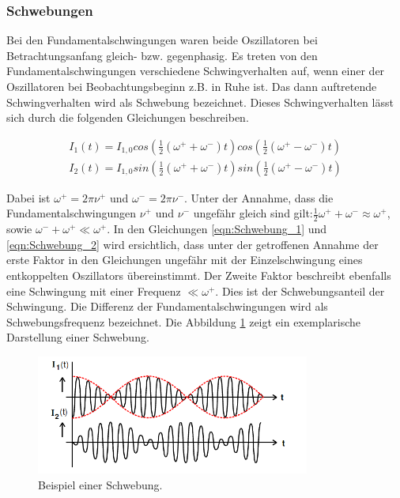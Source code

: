 \subsubsection{Schwebungen}

Bei den Fundamentalschwingungen waren beide Oszillatoren bei Betrachtungsanfang
gleich- bzw. gegenphasig. Es treten von den Fundamentalschwingungen
verschiedene Schwingverhalten auf, wenn einer der Oszillatoren bei
Beobachtungsbeginn z.B. in Ruhe ist.
Das dann auftretende Schwingverhalten wird als Schwebung bezeichnet.
Dieses Schwingverhalten lässt sich durch die folgenden Gleichungen beschreiben.

\begin{align}
  \label{eqn:Schwebung_1}
  I_1(t) = I_{1,0}cos\left(\frac{1}{2}\left(\omega^+ + \omega^-\right)t\right)cos\left(\frac{1}{2}\left(\omega^+-\omega^-\right)t\right)\\
  \label{eqn:Schwebung_2}
  I_2(t) = I_{1,0}sin\left(\frac{1}{2}\left(\omega^+ + \omega^-\right)t\right)sin\left(\frac{1}{2}\left(\omega^+-\omega^-\right)t\right)
\end{align}

Dabei ist $\omega^+ = 2\pi\nu^+$ und $\omega^- = 2\pi\nu^-$.
Unter der Annahme, dass die Fundamentalschwingungen $\nu^+$ und $\nu^-$ ungefähr
gleich sind gilt:$\frac{1}{2}\omega^++\omega^-\approx\omega^+$, sowie
$\omega^- + \omega^+ \ll\omega^+$.
In den Gleichungen \eqref{eqn:Schwebung_1} und \eqref{eqn:Schwebung_2} wird
ersichtlich, dass unter der getroffenen Annahme der erste Faktor in den Gleichungen
ungefähr mit der Einzelschwingung eines entkoppelten Oszillators übereinstimmt.
Der Zweite Faktor beschreibt ebenfalls eine Schwingung mit einer Frequenz
$\ll\omega^+$. Dies ist der Schwebungsanteil der Schwingung.
Die Differenz der Fundamentalschwingungen wird als Schwebungsfrequenz
bezeichnet. Die Abbildung \ref{fig:Schwebung} zeigt ein exemplarische Darstellung
einer Schwebung.

\begin{figure}
  \centering
  \includegraphics[width=9cm]{V355_Schwebung.png}
  \caption{Beispiel einer Schwebung.\cite{anleitung01}\protect}
  \label{fig:Schwebung}
\end{figure}

